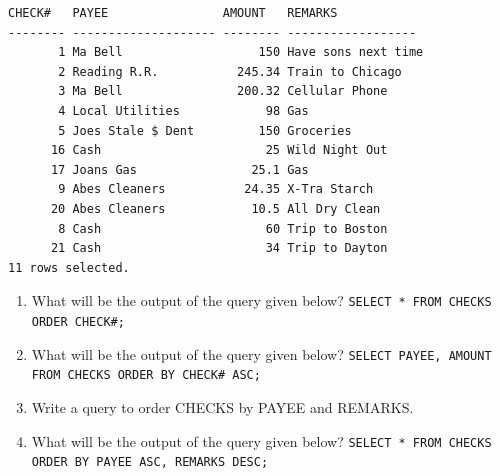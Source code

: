 \documentclass[11pt,a4paper]{article}
\def\AnswerBox{\fbox{\begin{minipage}{4in}\hfill\vspace{0.5in}\end{minipage}}}
\begin{document}
\begin{description}
\begin{verbatim}
CHECK#   PAYEE                AMOUNT   REMARKS
-------- -------------------- -------- ------------------
       1 Ma Bell                   150 Have sons next time
       2 Reading R.R.           245.34 Train to Chicago
       3 Ma Bell                200.32 Cellular Phone
       4 Local Utilities            98 Gas
       5 Joes Stale $ Dent         150 Groceries
      16 Cash                       25 Wild Night Out
      17 Joans Gas                25.1 Gas
       9 Abes Cleaners           24.35 X-Tra Starch       
      20 Abes Cleaners            10.5 All Dry Clean
       8 Cash                       60 Trip to Boston
      21 Cash                       34 Trip to Dayton
11 rows selected.
\end{verbatim}

\begin{enumerate}[label=\bfseries Q\arabic*:]\itemsep10pt
\item What will be the output of the query given below?\newline
\texttt{SELECT * FROM CHECKS ORDER CHECK\#;}
\item What will be the output of the query given below?\newline
\texttt{SELECT PAYEE, AMOUNT FROM CHECKS ORDER BY CHECK\# ASC;}
\item Write a query to order CHECKS by PAYEE and REMARKS.
\item What will be the output of the query given below?\newline
\texttt{SELECT * FROM CHECKS ORDER BY PAYEE ASC, REMARKS DESC;}
\end{enumerate}
\end{description}
\end{document}
